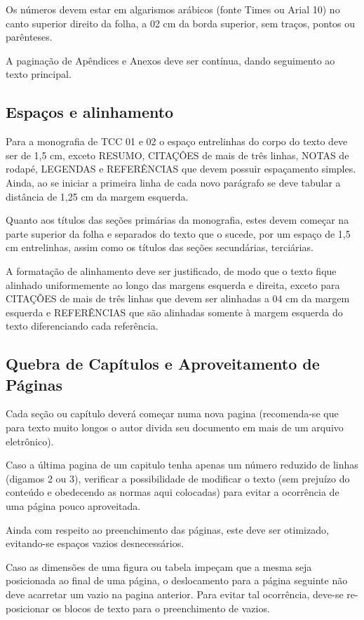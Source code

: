 Os números devem estar em algarismos arábicos (fonte Times ou Arial 10) no 
canto superior direito da folha, a 02 cm da borda superior, sem traços, 
pontos ou parênteses. 

A paginação de Apêndices e Anexos deve ser contínua, dando seguimento ao 
texto principal.

\subsection{Espaços e alinhamento}

Para a monografia de TCC 01 e 02 o espaço entrelinhas do corpo do texto 
deve ser de 1,5 cm, exceto RESUMO, CITAÇÔES de mais de três linhas, NOTAS 
de rodapé, LEGENDAS e REFERÊNCIAS que devem possuir espaçamento simples. 
Ainda, ao se iniciar a primeira linha de cada novo parágrafo se deve 
tabular a distância de 1,25 cm da margem esquerda.

Quanto aos títulos das seções primárias da monografia, estes devem começar 
na parte superior da folha e separados do texto que o sucede, por um espaço 
de 1,5 cm entrelinhas, assim como os títulos das seções secundárias, 
terciárias. 

A formatação de alinhamento deve ser justificado, de modo que o texto fique 
alinhado uniformemente ao longo das margens esquerda e direita, exceto para 
CITAÇÕES de mais de três linhas que devem ser alinhadas a 04 cm da margem 
esquerda e REFERÊNCIAS que são alinhadas somente à margem esquerda do texto 
diferenciando cada referência.

\subsection{Quebra de Capítulos e Aproveitamento de Páginas}

Cada seção ou capítulo deverá começar numa nova pagina (recomenda-se que 
para texto muito longos o autor divida seu documento em mais de um arquivo 
eletrônico). 

Caso a última pagina de um capitulo tenha apenas um número reduzido de 
linhas (digamos 2 ou 3), verificar a possibilidade de modificar o texto 
(sem prejuízo do conteúdo e obedecendo as normas aqui colocadas) para 
evitar a ocorrência de uma página pouco aproveitada.

Ainda com respeito ao preenchimento das páginas, este deve ser otimizado, 
evitando-se espaços vazios desnecessários. 

Caso as dimensões de uma figura ou tabela impeçam que a mesma seja 
posicionada ao final de uma página, o deslocamento para a página seguinte 
não deve acarretar um vazio na pagina anterior. Para evitar tal ocorrência, 
deve-se re-posicionar os blocos de texto para o preenchimento de vazios. 

